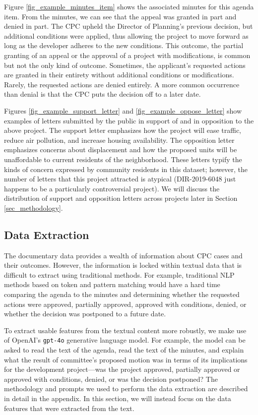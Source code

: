 Figure \ref{fig_example_minutes_item} shows the associated minutes for this agenda item. From the minutes, we can see that the appeal was granted in part and denied in part. The CPC upheld the Director of Planning's previous decision, but additional conditions were applied, thus allowing the project to move forward as long as the developer adheres to the new conditions. This outcome, the partial granting of an appeal or the approval of a project with modifications, is common but not the only kind of outcome. Sometimes, the applicant's requested actions are granted in their entirety without additional conditions or modifications. Rarely, the requested actions are denied entirely. A more common occurrence than denial is that the CPC puts the decision off to a later date. 

Figures \ref{fig_example_support_letter} and \ref{fig_example_oppose_letter} show examples of letters submitted by the public in support of and in opposition to the above project. The support letter emphasizes how the project will ease traffic, reduce air pollution, and increase housing availability. The opposition letter emphasizes concerns about displacement and how the proposed units will be unaffordable to current residents of the neighborhood. These letters typify the kinds of concern expressed by community residents in this dataset; however, the number of letters that this project attracted is atypical (DIR-2019-6048 just happens to be a particularly controversial project). We will discuss the distribution of support and opposition letters across projects later in Section \ref{sec_methodology}.

\subsection{Data Extraction}

The documentary data provides a wealth of information about CPC cases and their outcomes. However, the information is locked within textual data that is difficult to extract using traditional methods. For example, traditional NLP methods based on token and pattern matching would have a hard time comparing the agenda to the minutes and determining whether the requested actions were approved, partially approved, approved with conditions, denied, or whether the decision was postponed to a future date. 

To extract usable features from the textual content more robustly, we make use of OpenAI's \texttt{gpt-4o} generative language model. For example, the model can be asked to read the text of the agenda, read the text of the minutes, and explain what the result of committee's proposed motion was in terms of its implications for the development project---was the project approved, partially approved or approved with conditions, denied, or was the decision postponed? The methodology and prompts we used to perform the data extraction are described in detail in the appendix. In this section, we will instead focus on the data features that were extracted from the text.

